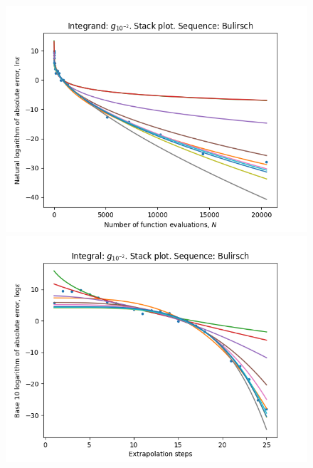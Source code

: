 \begin{figure}[H]
\centering
\begin{minipage}{0.45\textwidth}
\centering
\includegraphics[scale=0.45]{../results/romberg_plots/g_hundredth_hp_bulirsch_stack.png}
\end{minipage}
\begin{minipage}{0.45\textwidth}
\centering
\includegraphics[scale=0.45]{../results/romberg_plots/g_hundredth_hp_bulirsch_steps_stack.png}
\end{minipage}
\end{figure}

